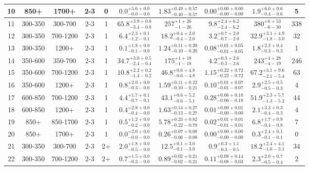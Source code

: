 \documentclass[11pt, oneside]{article}
\begin{document}
\begin{table}
{\begin{tabular}{ |c|c|c|c|c||c|c|c||c|c| }
10 & 850+ & 1700+ & 2-3 & 0 & $0.0^{+5.6+0.0}_{-0.0-0.0}$ & $1.83^{+0.49+0.57}_{-0.40-0.57}$ & $0.00^{+0.00+0.00}_{-0.00-0.00}$ & $1.9^{+6.0+0.6}_{-0.4-0.6}$ & 5 \\ \hline
11 & 300-350 & 300-700 & 2-3 & 1 & $65.8^{+3.9+0.8}_{-3.4-0.8}$ & $257^{+ 1+26}_{- 1-26}$ & $9.8^{+2.4+6.2}_{-2.4-6.2}$ & $380^{+ 6+53}_{- 6-30}$ & 338 \\ \hline
12 & 300-350 & 700-1200 & 2-3 & 1 & $6.4^{+2.3+0.1}_{-1.2-0.1}$ & $18.2^{+0.4+2.0}_{-0.4-2.0}$ & $3.2^{+0.7+2.0}_{-0.7-2.0}$ & $32.9^{+3.1+4.9}_{-1.8-3.0}$ & 32 \\ \hline
13 & 300-350 & 1200+ & 2-3 & 1 & $0.1^{+1.8+0.0}_{-0.1-0.0}$ & $1.24^{+0.11+0.20}_{-0.10-0.20}$ & $0.08^{+0.01+0.05}_{-0.01-0.05}$ & $1.8^{+2.3+0.4}_{-0.3-0.3}$ & 1 \\ \hline
14 & 350-600 & 350-700 & 2-3 & 1 & $34.7^{+3.0+0.5}_{-2.4-0.4}$ & $175^{+ 1+18}_{- 1-18}$ & $4.2^{+0.3+2.6}_{-0.3-2.6}$ & $243^{+ 4+28}_{- 4-19}$ & 246 \\ \hline
15 & 350-600 & 700-1200 & 2-3 & 1 & $10.8^{+2.2+0.2}_{-1.4-0.2}$ & $46.8^{+0.6+4.8}_{-0.6-4.8}$ & $1.15^{+0.22+0.72}_{-0.22-0.72}$ & $67.2^{+3.1+9.6}_{-2.1-5.4}$ & 63 \\ \hline
16 & 350-600 & 1200+ & 2-3 & 1 & $0.8^{+2.0+0.0}_{-0.3-0.0}$ & $1.59^{+0.11+0.22}_{-0.10-0.21}$ & $0.10^{+0.01+0.07}_{-0.01-0.07}$ & $2.9^{+2.5+0.5}_{-0.5-0.3}$ & 4 \\ \hline
17 & 600-850 & 700-1200 & 2-3 & 1 & $4.4^{+1.7+0.1}_{-0.7-0.1}$ & $43.1^{+0.6+5.2}_{-0.6-5.1}$ & $0.28^{+0.06+0.18}_{-0.06-0.18}$ & $51.9^{+2.3+5.7}_{-1.3-5.2}$ & 44 \\ \hline
18 & 600-850 & 1200+ & 2-3 & 1 & $0.4^{+2.8+0.0}_{-0.4-0.0}$ & $1.63^{+0.14+0.27}_{-0.13-0.27}$ & $0.01^{+0.00+0.01}_{-0.00-0.00}$ & $2.1^{+3.3+0.3}_{-0.4-0.3}$ & 4 \\ \hline
19 & 850+ & 850-1700 & 2-3 & 1 & $0.5^{+1.2+0.0}_{-0.2-0.0}$ & $5.78^{+0.23+0.82}_{-0.22-0.78}$ & $0.02^{+0.01+0.01}_{-0.01-0.01}$ & $6.8^{+1.7+0.9}_{-0.4-0.8}$ & 7 \\ \hline
20 & 850+ & 1700+ & 2-3 & 1 & $0.0^{+2.0+0.0}_{-0.0-0.0}$ & $0.26^{+0.07+0.08}_{-0.06-0.08}$ & $0.00^{+0.00+0.00}_{-0.00-0.00}$ & $0.3^{+2.4+0.1}_{-0.1-0.1}$ & 0 \\ \hline
21 & 300-350 & 300-700 & 2-3 & 2+ & $2.0^{+1.8+0.0}_{-0.5-0.0}$ & $12.5^{+0.1+3.0}_{-0.1-3.0}$ & $0.9^{+0.3+1.1}_{-0.3-0.5}$ & $18.2^{+2.4+4.1}_{-1.0-3.1}$ & 34 \\ \hline
22 & 300-350 & 700-1200 & 2-3 & 2+ & $0.7^{+1.5+0.0}_{-0.3-0.0}$ & $0.89^{+0.02+0.21}_{-0.02-0.21}$ & $0.11^{+0.08+0.14}_{-0.08-0.03}$ & $2.3^{+2.0+0.7}_{-0.5-0.4}$ & 2 \\ \hline

\end{tabular}}
\end{table}
\end{document}
